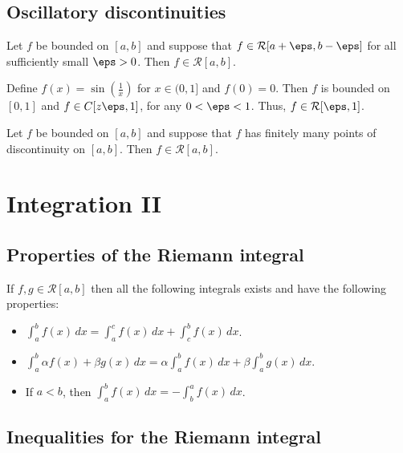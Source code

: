\documentclass[12pt, a4paper]{article}
\begin{document}
\subsection{Oscillatory discontinuities}

\begin{mdlemma}
    Let \(f\) be bounded on \([a,b]\) and suppose that \(f \in \mathcal{R}[a+\eps,b-\eps]\) for all sufficiently small \(\eps>0\). Then \(f \in \mathcal{R}[a,b]\).
\end{mdlemma}

\begin{example}
    Define \(f(x)=\sin\left( \frac{1}{x} \right)\) for \(x\in (0,1]\) and \(f(0)=0\). Then \(f\) is bounded on \([0,1]\) and \(f\in C[z\eps,1]\), for any \(0<\eps<1\). Thus, \(f\in \mathcal{R}[\eps,1]\).
\end{example}

\begin{mdthm}
    Let \(f\) be bounded on \([a,b]\) and suppose that \(f\) has finitely many points of discontinuity on \([a,b]\). Then \(f \in \mathcal{R}[a,b]\).
\end{mdthm}

\section{Integration II}

\subsection{Properties of the Riemann integral}

\begin{mdthm}
    If \(f,g \in \mathcal{R}[a,b]\) then all the following integrals exists and have the following properties:
    \begin{itemize}
        \item \(\int_a^b f(x) \, dx =\int_a^c f(x) \, dx +\int_c^b f(x) \, dx\).
        \item \(\int_a^b \alpha f(x) +\beta g(x) \, dx = \alpha\int_a^b f(x) \, dx+\beta\int_a^b g(x) \, dx\).
        \item If \(a<b\), then \(\int_a^b f(x) \, dx =-\int_b^a f(x) \, dx\).
    \end{itemize}
\end{mdthm}

\subsection{Inequalities for the Riemann integral}
\end{document}

